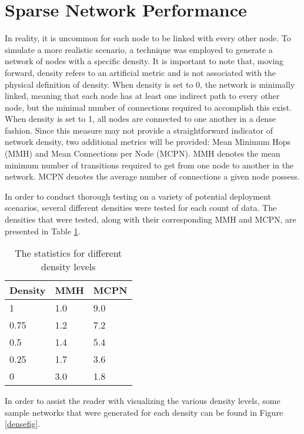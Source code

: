 \section{Sparse Network Performance}
In reality, it is uncommon for each node to be linked with every other node. To simulate a more realistic scenario, a technique was employed to generate a network of nodes with a specific density. It is important to note that, moving forward, density refers to an artificial metric and is not associated with the physical definition of density. When density is set to 0, the network is minimally linked, meaning that each node has at least one indirect path to every other node, but the minimal number of connections required to accomplish this exist. When density is set to 1, all nodes are connected to one another in a dense fashion. Since this measure may not provide a straightforward indicator of network density, two additional metrics will be provided:  Mean Minimum Hops (MMH) and Mean Connections per Node (MCPN). MMH denotes the mean minimum number of transitions required to get from one node to another in the network. MCPN denotes the average number of connections a given node possess.

In order to conduct thorough testing on a variety of potential deployment scenarios, several different densities were tested for each count of data. The densities that were tested, along with their corresponding MMH and MCPN, are presented in Table \ref{sparsedensities}.

\begin{table}[H]
	\centering
	\begin{tabular}{l|l|l}
		Density & MMH & MCPN \\ \hline
		1 & 1.0 & 9.0 \\
		0.75    & 1.2 & 7.2  \\
		0.5    & 1.4 & 5.4  \\
		0.25    & 1.7 & 3.6  \\
		0    & 3.0 & 1.8  \\
	\end{tabular}
	\caption{The statistics for different density levels} \label{sparsedensities}
\end{table}

In order to assist the reader with visualizing the various density levels, some sample networks that were generated for each density can be found in Figure \ref{densefig}.

